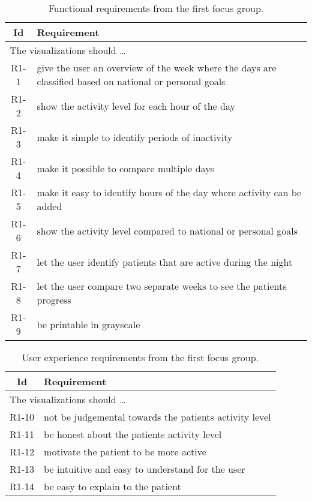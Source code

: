 \begin{table}[h!]
  \begin{center}
  \begin{tabular}{|c|p{12cm}|}
    \hline
      \textbf{Id} & \textbf{Requirement} \\ \hline
    \multicolumn{2}{|l|}{The visualizations should \ldots} \\ \hline
      R1-1 & give the user an overview of the week where the days are classified based on national or personal goals \\ \hline
      R1-2 & show the activity level for each hour of the day \\ \hline
      R1-3 & make it simple to identify periods of inactivity \\ \hline
      R1-4 & make it possible to compare multiple days \\ \hline
      R1-5 & make it easy to identify hours of the day where activity can be added \\ \hline
      R1-6 & show the activity level compared to national or personal goals \\ \hline
      R1-7 & let the user identify patients that are active during the night \\ \hline
      R1-8 & let the user compare two separate weeks to see the patients progress \\ \hline
      R1-9 & be printable in grayscale \\ \hline
  \end{tabular}
  \end{center}
  \caption[Functional requirements after the first focus group.]{Functional requirements from the first focus group.}
\end{table}

\begin{table}[h!]
  \begin{center}
  \begin{tabular}{|c|p{12cm}|}
    \hline
      \textbf{Id} & \textbf{Requirement} \\ \hline
    \multicolumn{2}{|l|}{The visualizations should \ldots} \\ \hline
      R1-10 & not be judgemental towards the patients activity level \\ \hline
      R1-11 & be honest about the patients activity level \\ \hline
      R1-12 & motivate the patient to be more active \\ \hline
      R1-13 & be intuitive and easy to understand for the user \\ \hline
      R1-14 & be easy to explain to the patient \\ \hline
  \end{tabular}
  \end{center}
  \caption[User experience requirements after the first focus group.]{User experience requirements from the first focus group.}
\end{table}

